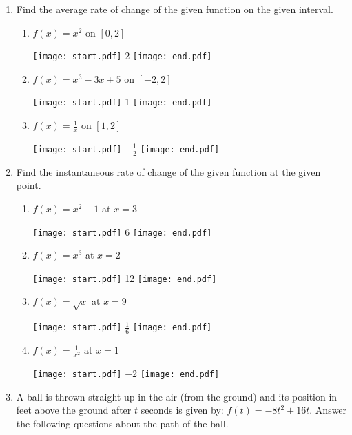 \documentclass[12pt]{article}
\begin{document}
\begin{enumerate}

\item Find the average rate of change of the given function on the given interval.

\begin{enumerate}

\item $f(x) = x^2$ on $[0,2]$ 

\texttt{[image: start.pdf]}
{{2}}
\texttt{[image: end.pdf]}


\item $f(x) = x^3-3x+5$ on $[-2,2]$ 

\texttt{[image: start.pdf]}
{{1}}
\texttt{[image: end.pdf]}


\item $\displaystyle f(x) = \frac{1}{x}$ on $[1,2]$ 

\texttt{[image: start.pdf]}
{{$\displaystyle -\frac{1}{2}$}}
\texttt{[image: end.pdf]}


\end{enumerate}

\item Find the instantaneous rate of change of the given function at the given point. 

\begin{enumerate}

\item $f(x) = x^2-1$ at $x=3$

\texttt{[image: start.pdf]}
{{6}}
\texttt{[image: end.pdf]}


\item $f(x) = x^3$ at $x=2$ 

\texttt{[image: start.pdf]}
{{12}}
\texttt{[image: end.pdf]}


\item $f(x)=\sqrt{x}$ at $x=9$

\texttt{[image: start.pdf]}
{{$\displaystyle \frac{1}{6}$}}
\texttt{[image: end.pdf]}


\item $\displaystyle f(x) = \frac{1}{x^2}$ at $x=1$ 

\texttt{[image: start.pdf]}
{{$-2$}}
\texttt{[image: end.pdf]}


\end{enumerate}

\newpage

\item A ball is thrown straight up in the air (from the ground) and its position in feet above the ground after $t$ seconds is given by: $f(t) = -8t^2+16t$. Answer the following questions about the path of the ball. 


\end{enumerate}
\end{document}
